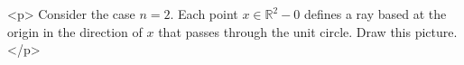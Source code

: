 <p>
    Consider the case $n = 2$. Each point $x \in \mathbb{R}^{2} - 0$ defines a ray based at the origin in
    the direction of $x$ that passes through the unit circle. Draw this picture.
</p>